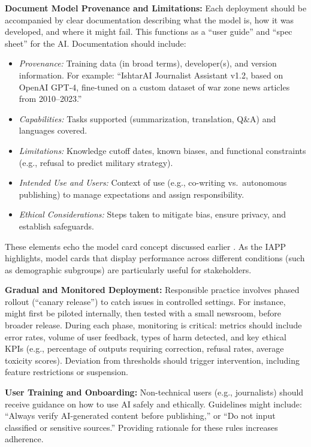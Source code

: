 \textbf{Document Model Provenance and Limitations:} Each deployment should be accompanied by clear documentation describing what the model is, how it was developed, and where it might fail. This functions as a ``user guide'' and ``spec sheet'' for the AI. Documentation should include:
\begin{itemize}
    \item \emph{Provenance:} Training data (in broad terms), developer(s), and version information. For example: ``IshtarAI Journalist Assistant v1.2, based on OpenAI GPT-4, fine-tuned on a custom dataset of war zone news articles from 2010--2023.''
    \item \emph{Capabilities:} Tasks supported (summarization, translation, Q\&A) and languages covered.
    \item \emph{Limitations:} Knowledge cutoff dates, known biases, and functional constraints (e.g., refusal to predict military strategy).
    \item \emph{Intended Use and Users:} Context of use (e.g., co-writing vs.\ autonomous publishing) to manage expectations and assign responsibility.
    \item \emph{Ethical Considerations:} Steps taken to mitigate bias, ensure privacy, and establish safeguards.
\end{itemize}
These elements echo the model card concept discussed earlier \cite{iapp2023}. As the IAPP highlights, model cards that display performance across different conditions (such as demographic subgroups) are particularly useful for stakeholders.

\textbf{Gradual and Monitored Deployment:} Responsible practice involves phased rollout (``canary release'') to catch issues in controlled settings. For instance, \ishtar{} might first be piloted internally, then tested with a small newsroom, before broader release. During each phase, monitoring is critical: metrics should include error rates, volume of user feedback, types of harm detected, and key ethical KPIs (e.g., percentage of outputs requiring correction, refusal rates, average toxicity scores). Deviation from thresholds should trigger intervention, including feature restrictions or suspension.

\textbf{User Training and Onboarding:} Non-technical users (e.g., journalists) should receive guidance on how to use AI safely and ethically. Guidelines might include: ``Always verify AI-generated content before publishing,'' or ``Do not input classified or sensitive sources.'' Providing rationale for these rules increases adherence.

